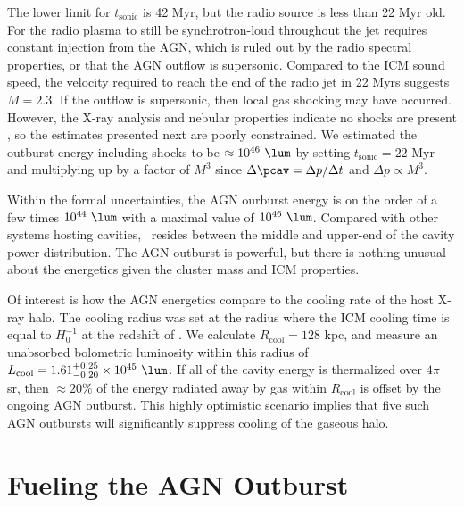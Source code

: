 \documentclass[useAMS,usenatbib]{mn2e}
\begin{document}
The lower limit for $t_{\mathrm{sonic}}$ is 42 Myr, but the radio
source is less than 22 Myr old. For the radio plasma to still be
synchrotron-loud throughout the jet requires constant injection from
the AGN, which is ruled out by the radio spectral properties, or that
the AGN outflow is supersonic. Compared to the ICM sound speed, the
velocity required to reach the end of the radio jet in 22 Myrs
suggests $M = 2.3$. If the outflow is supersonic, then local gas
shocking may have occurred. However, the X-ray analysis and nebular
properties indicate no shocks are present \citep{1996MNRAS.283.1003C,
  2000AJ....120..562T}, so the estimates presented next are poorly
constrained. We estimated the outburst energy including shocks to be
$\approx 10^{46} ~\lum$ by setting $t_{\mathrm{sonic}} = 22$ Myr and
multiplying up by a factor of $M^3$ since $\Delta \pcav = \Delta p /
\Delta t$ and $\Delta p \propto M^3$.

Within the formal uncertainties, the AGN ourburst energy is on the
order of a few times $10^{44} ~\lum$ with a maximal value of $10^{46}
~\lum$. Compared with other systems hosting cavities, \irs\ resides
between the middle and upper-end of the cavity power distribution. The
AGN outburst is powerful, but there is nothing unusual about the
energetics given the cluster mass and ICM properties.

Of interest is how the AGN energetics compare to the cooling rate of
the host X-ray halo. The cooling radius was set at the radius where
the ICM cooling time is equal to $H_0^{-1}$ at the redshift of
\irs. We calculate $R_{\mathrm{cool}} = 128$ kpc, and measure an
unabsorbed bolometric luminosity within this radius of
$L_{\mathrm{cool}} = 1.61^{+0.25}_{-0.20} \times 10^{45} ~\lum$. If
all of the cavity energy is thermalized over $4\pi$ sr, then $\approx
20\%$ of the energy radiated away by gas within $R_{\mathrm{cool}}$ is
offset by the ongoing AGN outburst. This highly optimistic scenario
implies that five such AGN outbursts will significantly suppress
cooling of the gaseous halo.

\section{Fueling the AGN Outburst}
\label{sec:fuel}
\end{document}
